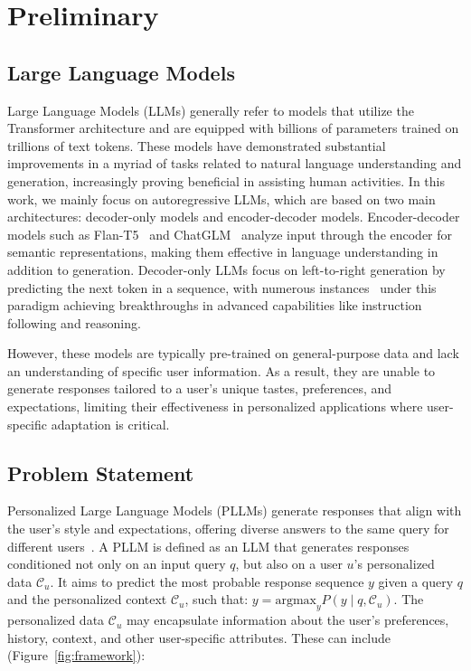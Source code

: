 \section{Preliminary}

\subsection{Large Language Models}
Large Language Models (LLMs) generally refer to models that utilize the Transformer architecture and are equipped with billions of parameters trained on trillions of text tokens. These models have demonstrated substantial improvements in a myriad of tasks related to natural language understanding and generation, increasingly proving beneficial in assisting human activities. In this work, we mainly focus on autoregressive LLMs, which are based on two main architectures:  decoder-only models and encoder-decoder models. Encoder-decoder models such as Flan-T5~\citep{chung2022scaling} and ChatGLM~\citep{zeng2022glm} analyze input through the encoder for semantic representations,  making them effective in language understanding in addition to generation. 
Decoder-only LLMs focus on left-to-right generation by predicting the next token in a sequence, with numerous instances~\citep{brown2020language, chowdhery2022palm, touvron2023llama, guo2025deepseek} under this paradigm achieving breakthroughs in advanced capabilities like instruction following and reasoning.

However, these models are typically pre-trained on general-purpose data and lack an understanding of specific user information. As a result, they are unable to generate responses tailored to a user's unique tastes, preferences, and expectations, limiting their effectiveness in personalized applications where user-specific adaptation is critical.


\subsection{Problem Statement}

Personalized Large Language Models (PLLMs) generate responses that align with the user's style and expectations, offering diverse answers to the same query for different users~\citep{clarke2024peft}.
A PLLM is defined as an LLM that generates responses conditioned not only on an input query $q$, but also on a user $u$'s personalized data $\mathcal{C}_u$. It aims to predict the most probable response sequence $y$ given a query $q$ and the personalized context $\mathcal{C}_u$, such that:
$
y = \text{argmax}_y P(y \mid q, \mathcal{C}_u).
$
The personalized data $\mathcal{C}_u$ may encapsulate information about the user’s preferences, history, context, and other user-specific attributes. These can include (Figure~\ref{fig:framework}):

